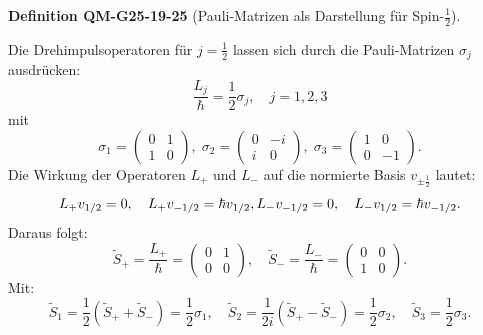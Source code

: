 \documentclass[10pt, letterpaper]{article}
\newcommand{\CustomHeading}[3]{%
  \par\medskip\noindent%
  \textbf{#1 #2} \textnormal{(#3)}.\enskip%
}
\newenvironment{DEF}[2]{\CustomHeading{Definition}{#1}{#2}}{}
\begin{document}
\begin{DEF}{QM-G25-19-25}{Pauli-Matrizen als Darstellung für Spin-\(\frac{1}{2}\)}
Die Drehimpulsoperatoren für \(j = \frac{1}{2}\) lassen sich durch die Pauli-Matrizen \(\sigma_j\) ausdrücken:
$$
\frac{L_j}{\hbar} = \frac{1}{2} \sigma_j, \quad j = 1, 2, 3
$$
mit
$$
\sigma_1 = \begin{pmatrix} 0 & 1 \\ 1 & 0 \end{pmatrix},\;
\sigma_2 = \begin{pmatrix} 0 & -i \\ i & 0 \end{pmatrix},\;
\sigma_3 = \begin{pmatrix} 1 & 0 \\ 0 & -1 \end{pmatrix}.
$$
Die Wirkung der Operatoren \(L_+\) und \(L_-\) auf die normierte Basis \(v_{\pm \frac{1}{2}}\) lautet:
$$
L_+ v_{1/2} = 0, \quad L_+ v_{-1/2} = \hbar v_{1/2}, \\
L_- v_{-1/2} = 0, \quad L_- v_{1/2} = \hbar v_{-1/2}.
$$
Daraus folgt:
$$
\tilde{S}_+ = \frac{L_+}{\hbar} = \begin{pmatrix} 0 & 1 \\ 0 & 0 \end{pmatrix}, \quad
\tilde{S}_- = \frac{L_-}{\hbar} = \begin{pmatrix} 0 & 0 \\ 1 & 0 \end{pmatrix}.
$$
Mit:
$$
\tilde{S}_1 = \frac{1}{2}(\tilde{S}_+ + \tilde{S}_-) = \frac{1}{2} \sigma_1, \quad
\tilde{S}_2 = \frac{1}{2i}(\tilde{S}_+ - \tilde{S}_-) = \frac{1}{2} \sigma_2, \quad
\tilde{S}_3 = \frac{1}{2} \sigma_3.
$$
\end{DEF}
\end{document}
